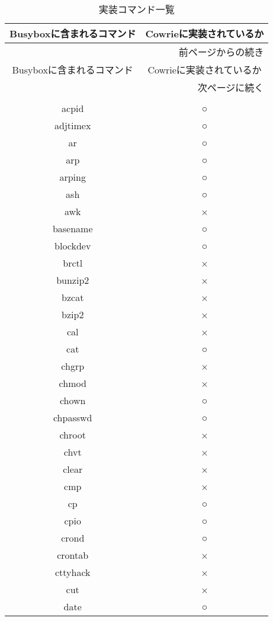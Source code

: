 \begin{longtable}{cc}
 \caption{実装コマンド一覧}
 \label{table:command} \\
 \hline
 Busyboxに含まれるコマンド & Cowrieに実装されているか \\ \hline\hline
 \endfirsthead
 \multicolumn{2}{r}{前ページからの続き} \\ \hline
 Busyboxに含まれるコマンド & Cowrieに実装されているか \\ \hline\hline
 \endhead
 \hline
 \multicolumn{2}{r}{次ページに続く} \\
 \endfoot
 \hline
 \multicolumn{2}{r}{以上} \\
 \endlastfoot
acpid & ○ \\ \hline
adjtimex & ○ \\ \hline
ar & ○ \\ \hline
arp & ○ \\ \hline
arping & ○ \\ \hline
ash & ○ \\ \hline
awk & × \\ \hline
basename & ○ \\ \hline
blockdev & ○ \\ \hline
brctl & × \\ \hline
bunzip2 & × \\ \hline
bzcat & × \\ \hline
bzip2 & × \\ \hline
cal & × \\ \hline
cat & ○ \\ \hline
chgrp & × \\ \hline
chmod & × \\ \hline
chown & ○ \\ \hline
chpasswd & ○ \\ \hline
chroot & × \\ \hline
chvt & × \\ \hline
clear & × \\ \hline
cmp & × \\ \hline
cp & ○ \\ \hline
cpio & ○ \\ \hline
crond & ○ \\ \hline
crontab & × \\ \hline
cttyhack & × \\ \hline
cut & × \\ \hline
date & ○ \\ \hline

\end{longtable}
